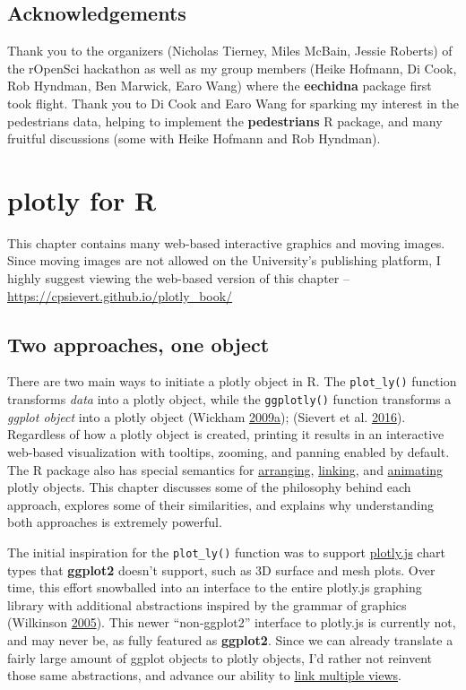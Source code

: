 \documentclass[12pt,]{isuthesis}
\begin{document}
\section{Acknowledgements}\label{acknowledgements-1}

Thank you to the organizers (Nicholas Tierney, Miles McBain, Jessie
Roberts) of the rOpenSci hackathon as well as my group members (Heike
Hofmann, Di Cook, Rob Hyndman, Ben Marwick, Earo Wang) where the
\textbf{eechidna} package first took flight. Thank you to Di Cook and
Earo Wang for sparking my interest in the pedestrians data, helping to
implement the \textbf{pedestrians} R package, and many fruitful
discussions (some with Heike Hofmann and Rob Hyndman).

\chapter{plotly for R}

This chapter contains many web-based interactive graphics and moving
images. Since moving images are not allowed on the University's
publishing platform, I highly suggest viewing the web-based version of
this chapter -- \url{https://cpsievert.github.io/plotly_book/}

\section{Two approaches, one object}\label{two-approaches-one-object}

There are two main ways to initiate a plotly object in R. The
\texttt{plot\_ly()} function transforms \emph{data} into a plotly
object, while the \texttt{ggplotly()} function transforms a \emph{ggplot
object} into a plotly object (Wickham
\protect\hyperlink{ref-ggplot2}{2009}\protect\hyperlink{ref-ggplot2}{a});
(Sievert et al. \protect\hyperlink{ref-plotly}{2016}). Regardless of how
a plotly object is created, printing it results in an interactive
web-based visualization with tooltips, zooming, and panning enabled by
default. The R package also has special semantics for
\protect\hyperlink{arranging-multiple-views}{arranging},
\protect\hyperlink{multiple-linked-views}{linking}, and
\protect\hyperlink{animating-views}{animating} plotly objects. This
chapter discusses some of the philosophy behind each approach, explores
some of their similarities, and explains why understanding both
approaches is extremely powerful.

The initial inspiration for the \texttt{plot\_ly()} function was to
support \href{https://github.com/plotly/plotly.js}{plotly.js} chart
types that \textbf{ggplot2} doesn't support, such as 3D surface and mesh
plots. Over time, this effort snowballed into an interface to the entire
plotly.js graphing library with additional abstractions inspired by the
grammar of graphics (Wilkinson
\protect\hyperlink{ref-Wilkinson:2005}{2005}). This newer
``non-ggplot2'' interface to plotly.js is currently not, and may never
be, as fully featured as \textbf{ggplot2}. Since we can already
translate a fairly large amount of ggplot objects to plotly objects, I'd
rather not reinvent those same abstractions, and advance our ability to
\protect\hyperlink{multiple-linked-views}{link multiple views}.
\end{document}
